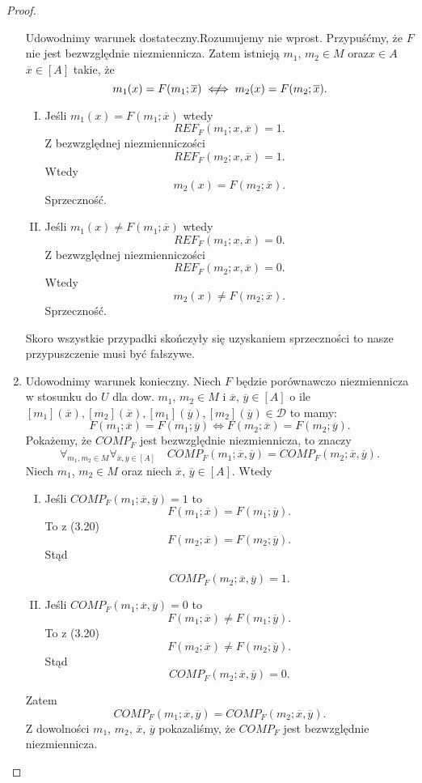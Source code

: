 \documentclass[12pt,a4paper]{report}
\newcommand{\domkniecie}[1]{\left[ {#1} \right] }
\newcommand{\notiff}{%
  \mathrel{{\ooalign{\hidewidth$\not\phantom{"}$\hidewidth\cr$\iff$}}}}
\begin{document}
\begin{proof}
\begin{enumerate}
Udowodnimy warunek dostateczny.Rozumujemy nie wprost. Przypuśćmy, że $F$ nie jest bezwzględnie niezmiennicza. Zatem istnieją $m_1$, $m_2 \in M$ oraz$x\in A$ $\overline{x} \in \domkniecie{A}$ takie, że
$$
m_{1}(x)=F(m_{1};\overline{x}) \notiff m_{2}(x)=F(m_{2};\overline{x}).
$$
\begin{enumerate}[I.]
\item
Jeśli $m_1(x)=F(m_1;\overline{x})$ wtedy 
$$
REF_{F}(m_1;x,\overline{x})=1.
$$
Z bezwzględnej niezmienniczości
 $$
 REF_{F}(m_2;x,\overline{x})=1.
 $$
Wtedy
$$
m_2(x)=F(m_2;\overline{x}).
$$
Sprzeczność.
\item
Jeśli $m_1(x)\ne F(m_1;\overline{x})$ wtedy 
$$
REF_{F}(m_1;x,\overline{x})=0.
$$
Z bezwzględnej niezmienniczości 
$$
REF_{F}(m_2;x,\overline{x})=0.
$$ 
Wtedy
$$
m_2(x)\ne F(m_2;\overline{x}).
$$
 Sprzeczność.
\end{enumerate}
Skoro wszystkie przypadki skończyły się uzyskaniem sprzeczności to nasze przypuszczenie musi być fałszywe.
\item 
Udowodnimy warunek konieczny. Niech $F$ będzie porównawczo niezmiennicza w stosunku do $U$ 
dla dow. $m_1$, $m_2 \in M$ i $\overline{x}$, $\overline{y} \in \domkniecie{A}$ o ile $\domkniecie{m_1}(\overline{x}), \domkniecie{ m_2}(\overline{x}), \domkniecie{m_1}(\overline{y}), \domkniecie{m_2}(\overline{y}) \in \mathcal{D}$ to mamy:
\begin{equation}
F(m_{1};\overline{x})=F(m_{1};\overline{y}) \iff F(m_{2};\overline{x})=F(m_{2};\overline{y}).
\end{equation}
Pokażemy, że $COMP_{F}$ jest bezwzględnie niezmiennicza, to znaczy
\begin{equation}
\forall_{m_1, m_2 \in M} \forall_{\overline{x}, \overline{y}\in \domkniecie{A}} \quad COMP_{F}(m_1;\overline{x},\overline{y})=COMP_{F}(m_2;\overline{x},\overline{y}).
\end{equation}
 Niech $m_1$, $m_2 \in M$ oraz niech $\overline{x}$, $\overline{y} \in \domkniecie{A}$. Wtedy
\begin{enumerate}[I.]
\item
Jeśli $COMP_{F}(m_1;\overline{x},\overline{y})=1$ to
$$
F(m_1;\overline{x})=F(m_1;\overline{y}).
$$
To z (3.20) 
$$
F(m_2;\overline{x})=F(m_2;\overline{y}).
$$
Stąd 

$$
COMP_{F}(m_2;\overline{x},\overline{y})=1.
$$
\item
Jeśli $COMP_{F}(m_1;\overline{x},\overline{y})=0$ to 
$$
F(m_1;\overline{x})\ne F(m_1;\overline{y}).
$$
To z (3.20) 
$$
F(m_2;\overline{x})\ne F(m_2;\overline{y}).
$$
Stąd 
$$
COMP_{F}(m_2;\overline{x},\overline{y})=0.
$$
\end{enumerate}
Zatem 
$$
COMP_{F}(m_1;\overline{x},\overline{y})=COMP_{F}(m_2;\overline{x},\overline{y}).
$$
Z dowolności $m_1$, $m_2$, $\overline{x}$, $\overline{y}$ pokazaliśmy, że $COMP_{F}$ jest bezwzględnie niezmiennicza.


\end{enumerate}
\end{proof}
\end{document}
